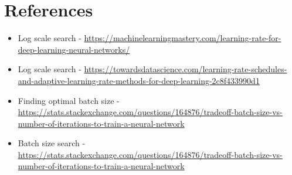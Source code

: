 \documentclass[12pt]{scrartcl}
\begin{document}
\section{References}
\begin{itemize}
\item Log scale search - \url{https://machinelearningmastery.com/learning-rate-for-deep-learning-neural-networks/}

\item Log scale search - \url{https://towardsdatascience.com/learning-rate-schedules-and-adaptive-learning-rate-methods-for-deep-learning-2c8f433990d1}

\item Finding optimal batch size - \url{https://stats.stackexchange.com/questions/164876/tradeoff-batch-size-vs-number-of-iterations-to-train-a-neural-network}

\item Batch size search - \url{https://stats.stackexchange.com/questions/164876/tradeoff-batch-size-vs-number-of-iterations-to-train-a-neural-network}
\end{itemize}
\end{document}
